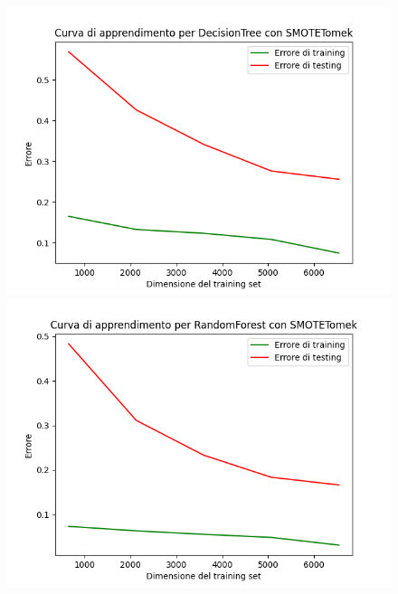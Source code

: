 \begin{figure}[H]
    \centering
    \begin{minipage}[b]{0.45\linewidth}
      \centering
      \includegraphics[scale=0.5]{img/learning_curve_DecisionTree_SMOTETomek.png}
      
    \end{minipage}
    \hfill
    \begin{minipage}[b]{0.45\linewidth}
      \centering
      \includegraphics[scale=0.5]{img/learning_curve_RandomForest_SMOTETomek.png}
      
    \end{minipage}
    

\end{figure}

